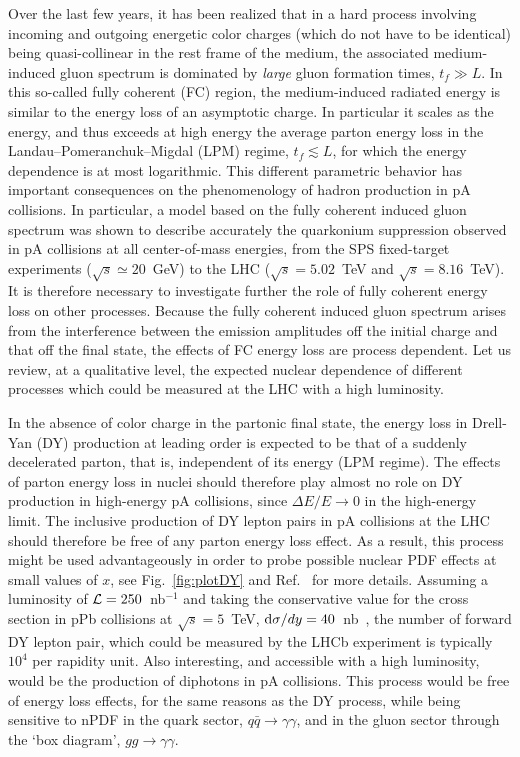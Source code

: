 \documentclass[../report.tex]{subfiles}
\begin{document}
Over the last few years, it has been realized that in a hard process involving incoming and outgoing energetic color charges (which do not have to be identical) being quasi-collinear in the rest frame of the medium, the associated medium-induced gluon spectrum is dominated by {\it large} gluon formation times, $t_f \gg L$. In this so-called fully coherent (FC) region, the medium-induced radiated energy is similar to the energy loss of an asymptotic charge. In particular it scales as the energy, and thus exceeds at high energy the average parton energy loss in the Landau--Pomeranchuk--Migdal (LPM) regime, $t_f \lesssim L$, for which the energy dependence is at most logarithmic.
%
This different parametric behavior has important consequences on the phenomenology of hadron production in pA collisions. In particular, a model based on the fully coherent induced gluon spectrum was shown to describe accurately the quarkonium suppression observed in pA collisions at all center-of-mass energies, from the SPS fixed-target experiments ($\sqrt{s}\simeq 20$~GeV) to the LHC ($\sqrt{s}=5.02$~TeV and $\sqrt{s}=8.16$~TeV). It is therefore necessary to investigate further the role of fully coherent energy loss on other processes.
%
Because the fully coherent induced gluon spectrum arises from the interference between the emission amplitudes off the initial charge and that off the final state, the effects of FC energy loss are process dependent. Let us review, at a qualitative level, the expected nuclear dependence of different processes which could be measured at the LHC with a high luminosity.

In the absence of color charge in the partonic final state, the energy loss in Drell-Yan (DY) production at leading order is expected to be that of a suddenly decelerated parton, that is, independent of its energy (LPM regime). The effects of parton energy loss in nuclei should therefore play almost no role on DY production in high-energy pA collisions, since $\Delta E / E \to 0$ in the high-energy limit. The inclusive production of DY lepton pairs in pA collisions at the LHC should therefore be free of any parton energy loss effect. As a result, this process might be used advantageously in order to probe possible nuclear PDF effects at small values of $x$, see \eg Fig.~\ref{fig:plotDY} and Ref.~\cite{Arleo:2015qiv} for more details. Assuming a luminosity of ${\cal L}=250$~nb$^{-1}$ and taking the conservative value for the cross section in pPb collisions at $\sqrt{s}=5$~TeV, ${\rm d}\sigma/dy=40$~nb~\cite{Arleo:2015qiv}, the number of forward DY lepton pair, which could be measured by the LHCb experiment is typically $10^4$ per rapidity unit. Also interesting, and accessible with a high luminosity, would be the production of diphotons in pA collisions. This process would be free of energy loss effects, for the same reasons as the DY process, while being sensitive to nPDF in the quark sector, $q\bar{q} \to \gamma\gamma$, and in the gluon sector through the `box diagram', $gg \to \gamma\gamma$.
\end{document}
